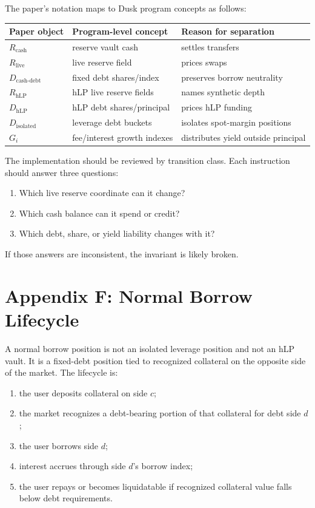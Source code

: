 \documentclass[11pt]{article}
\newcommand{\cash}{\mathrm{cash}}
\newcommand{\live}{\mathrm{live}}
\newcommand{\hlp}{\mathrm{hLP}}
\newcommand{\debt}{\mathrm{debt}}
\begin{document}
The paper's notation maps to Dusk program concepts as follows:
\begin{center}
\begin{tabular}{lll}
\toprule
Paper object & Program-level concept & Reason for separation \\
\midrule
$R_{\cash}$ & reserve vault cash & settles transfers \\
$R_{\live}$ & live reserve field & prices swaps \\
$D_{\cash\text{-}\debt}$ & fixed debt shares/index & preserves borrow neutrality \\
$R_{\hlp}$ & hLP live reserve fields & names synthetic depth \\
$D_{\hlp}$ & hLP debt shares/principal & prices hLP funding \\
$D_{\mathrm{isolated}}$ & leverage debt buckets & isolates spot-margin positions \\
$G_i$ & fee/interest growth indexes & distributes yield outside principal \\
\bottomrule
\end{tabular}
\end{center}

The implementation should be reviewed by transition class. Each instruction should answer three questions:
\begin{enumerate}
  \item Which live reserve coordinate can it change?
  \item Which cash balance can it spend or credit?
  \item Which debt, share, or yield liability changes with it?
\end{enumerate}
If those answers are inconsistent, the invariant is likely broken.

\section{Appendix F: Normal Borrow Lifecycle}

A normal borrow position is not an isolated leverage position and not an hLP vault. It is a fixed-debt position tied to recognized collateral on the opposite side of the market. The lifecycle is:
\begin{enumerate}
  \item the user deposits collateral on side $c$;
  \item the market recognizes a debt-bearing portion of that collateral for debt side $d$;
  \item the user borrows side $d$;
  \item interest accrues through side $d$'s borrow index;
  \item the user repays or becomes liquidatable if recognized collateral value falls below debt requirements.
\end{enumerate}
\end{document}
